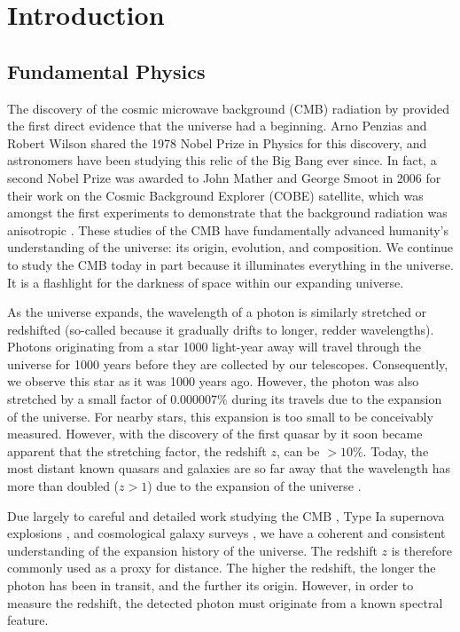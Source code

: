 \chapter{Introduction}
\label{chapter1}

\begin{bibunit}

\section{Fundamental Physics}

The discovery of the cosmic microwave background (CMB) radiation by \citet{1965ApJ...142..419P}
provided the first direct evidence that the universe had a beginning. Arno Penzias and Robert Wilson
shared the 1978 Nobel Prize in Physics for this discovery, and astronomers have been studying this
relic of the Big Bang ever since. In fact, a second Nobel Prize was awarded to John Mather and
George Smoot in 2006 for their work on the Cosmic Background Explorer (COBE) satellite, which was
amongst the first experiments to demonstrate that the background radiation was anisotropic
\citep{1992ApJ...396L...1S}. These studies of the CMB have fundamentally advanced humanity's
understanding of the universe: its origin, evolution, and composition. We continue to study the CMB
today in part because it illuminates everything in the universe. It is a flashlight for the darkness
of space within our expanding universe.

As the universe expands, the wavelength of a photon is similarly stretched or redshifted (so-called
because it gradually drifts to longer, redder wavelengths). Photons originating from a star 1000
light-year away will travel through the universe for 1000 years before they are collected by our
telescopes. Consequently, we observe this star as it was 1000 years ago. However, the photon was
also stretched by a small factor of $0.000007\%$ during its travels due to the expansion of the
universe.  For nearby stars, this expansion is too small to be conceivably measured.  However, with
the discovery of the first quasar by \citet{1963Natur.197.1040S} it soon became apparent that the
stretching factor, the redshift $z$, can be $>10\%$. Today, the most distant known quasars and
galaxies are so far away that the wavelength has more than doubled ($z > 1$) due to the expansion of
the universe \citep[e.g.,][]{2011Natur.474..616M, 2015ApJ...810L..12Z, 2016ApJ...819..129O,
2018Natur.553..473B}.

Due largely to careful and detailed work studying the CMB \citep[e.g.,][]{2013ApJS..208...19H,
2016A&A...594A..25P}, Type Ia supernova explosions \citep[e.g.,][]{1998AJ....116.1009R,
1999ApJ...517..565P}, and cosmological galaxy surveys \citep[e.g.,][]{2001MNRAS.328.1039C}, we have
a coherent and consistent understanding of the expansion history of the universe. The redshift $z$
is therefore commonly used as a proxy for distance. The higher the redshift, the longer the photon
has been in transit, and the further its origin. However, in order to measure the redshift, the
detected photon must originate from a known spectral feature.


\end{bibunit}
